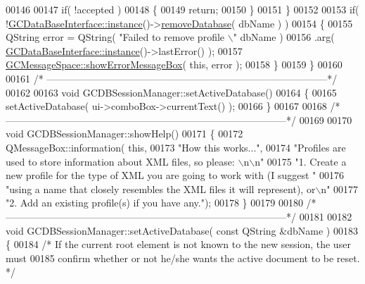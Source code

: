 \begin{DoxyCode}
00146 
00147     \textcolor{keywordflow}{if}( !accepted )
00148     \{
00149       \textcolor{keywordflow}{return};
00150     \}
00151   \}
00152 
00153   \textcolor{keywordflow}{if}( !\hyperlink{class_g_c_data_base_interface_a1baea9c0667aa8b610ec30076fcab84c}{GCDataBaseInterface::instance}()->\hyperlink{class_g_c_d_b_session_manager_a0fc44e9d2efb407cc0964295920b2432}{removeDatabase}( dbName ) )
00154   \{
00155     QString error = QString( \textcolor{stringliteral}{"Failed to remove profile \(\backslash\)"%
      dbName )
00156                     .arg( \hyperlink{class_g_c_data_base_interface_a1baea9c0667aa8b610ec30076fcab84c}{GCDataBaseInterface::instance}()->lastError() );
00157     \hyperlink{namespace_g_c_message_space_ab118b3a133686167617eb955029fd44e}{GCMessageSpace::showErrorMessageBox}( \textcolor{keyword}{this}, error );
00158   \}
00159 \}
00160 
00161 \textcolor{comment}{/*
      --------------------------------------------------------------------------------------*/}
00162 
00163 \textcolor{keywordtype}{void} GCDBSessionManager::setActiveDatabase()
00164 \{
00165   setActiveDatabase( ui->comboBox->currentText() );
00166 \}
00167 
00168 \textcolor{comment}{/*
      --------------------------------------------------------------------------------------*/}
00169 
00170 \textcolor{keywordtype}{void} GCDBSessionManager::showHelp()
00171 \{
00172   QMessageBox::information( \textcolor{keyword}{this},
00173                             \textcolor{stringliteral}{"How this works..."},
00174                             \textcolor{stringliteral}{"Profiles are used to store information about XML
       files, so please: \(\backslash\)n\(\backslash\)n"}
00175                             \textcolor{stringliteral}{"1. Create a new profile for the type of XML you
       are going to work with (I suggest "}
00176                             \textcolor{stringliteral}{"using a name that closely resembles the XML files
       it will represent), or\(\backslash\)n"}
00177                             \textcolor{stringliteral}{"2. Add an existing profile(s) if you have any."});
00178 \}
00179 
00180 \textcolor{comment}{/*
      --------------------------------------------------------------------------------------*/}
00181 
00182 \textcolor{keywordtype}{void} GCDBSessionManager::setActiveDatabase( \textcolor{keyword}{const} QString &dbName )
00183 \{
00184   \textcolor{comment}{/* If the current root element is not known to the new session, the user must}
00185 \textcolor{comment}{    confirm whether or not he/she wants the active document to be reset. */}
}
\end{DoxyCode}
